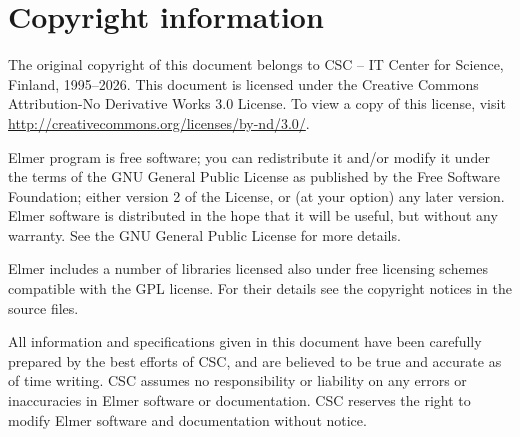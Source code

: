 \section*{Copyright information}

The original copyright of this document belongs to
CSC -- IT Center for Science, Finland, 1995--2026. 
This document is licensed under the Creative Commons Attribution-No Derivative Works 3.0 License. 
To view a copy of this license, visit \url{http://creativecommons.org/licenses/by-nd/3.0/}.

Elmer program is free software; you can redistribute it and/or
modify it under the terms of the GNU General Public License
as published by the Free Software Foundation; either version 2
of the License, or (at your option) any later version.
Elmer software is distributed in the hope that it will be useful,
but without any warranty. See the
GNU General Public License for more details.

Elmer includes a number of libraries licensed also under free licensing 
schemes compatible with the GPL license.
For their details see the copyright notices in the source files. 

All information and specifications
given in this document have been carefully prepared by the best efforts of CSC, and are believed
to be true and accurate as of time writing. 
CSC assumes no responsibility or liability on any errors or inaccuracies in 
Elmer software or documentation. 
CSC reserves the right to 
modify Elmer software and documentation without notice. \\  \mbox{} \\
